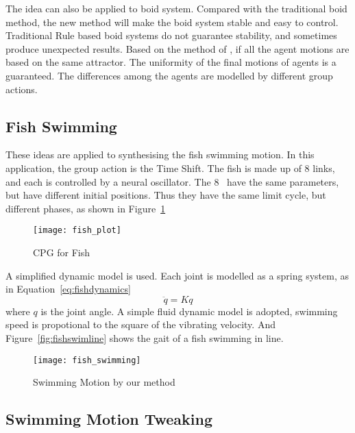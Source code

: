 The idea can also be applied to boid system\citep{reynolds1987flocks}.
Compared with the traditional boid method, the new method will make the boid system stable and easy to control.
Traditional Rule based boid systems do not guarantee stability, and sometimes produce unexpected results.
Based on the method of \moit, if all the agent motions are based on the same attractor.
The uniformity of the final motions of agents is a guaranteed.
The differences  among the agents are modelled by different group actions.

\subsection*{Fish Swimming}
These ideas are applied to synthesising the fish swimming motion.
In this application, the group action is the Time Shift.
The fish is made up of 8 links, and each {\dof} is controlled by a neural oscillator.
The $8$ \cpg\ have the same parameters, but have different initial positions. 
Thus they have the same limit cycle, but different phases, as shown in Figure~\ref{fig:fishplot}



\begin{figure}[!htbp]
  \begin{center}
      \texttt{[image: fish\_plot]}
    \caption{CPG for Fish}
    \label{fig:fishplot}
\end{center}
\end{figure}




A simplified dynamic model is used.
Each joint is modelled as a spring system, as in Equation~\ref{eq:fishdynamics}
\begin{equation}
\label{eq:fishdynamics}
\ddot{q}=Kq
\end{equation}
where $q$ is the joint angle.
A simple fluid dynamic model is adopted,  swimming speed is propotional to the square of the vibrating velocity.
And Figure~\ref{fig:fishswimline} shows the gait of a fish swimming in line.
\begin{figure}[!htbp]
  \begin{center}
      \texttt{[image: fish\_swimming]}
    \caption{Swimming Motion by our method}
    \label{fig:fishswimming}
\end{center}
\end{figure}


\subsection{Swimming Motion Tweaking}


